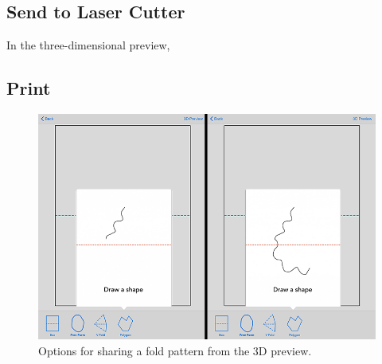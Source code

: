 \subsection{Send to Laser Cutter}\label{send-to-laser-cutter}

In the three-dimensional preview,

\subsection{Print}\label{print}

\begin{figure}[htbp]
\centering
\includegraphics{figures/32_UI_Tool_Interactions/tutorial_step_one_two.png}
\caption{Options for sharing a fold pattern from the 3D preview.}
\end{figure}
